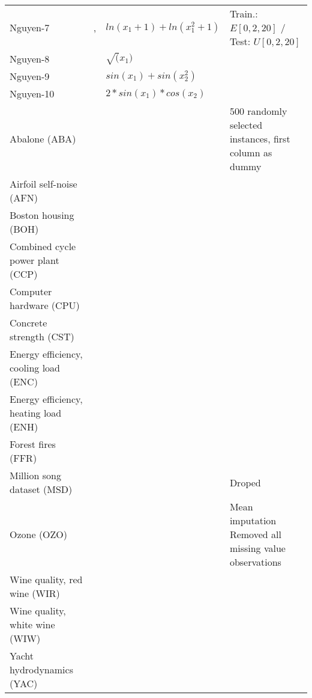 \begin{table*}[htbp]
\begin{center}
\begin{tabular}{llll}
Nguyen-7 & \cite{krawiec2013approximating},\cite{worm2013prioritized,wieloch2013running,harada2014asynchronously,krawiec2014behavioral,demelo2014kaizen,lacava2015genetic,liskowski2017discovery} & $ln(x_1+1)+ln(x_1^2+1)$ & Train.: $E[0,2,20]$ / Test: $U[0,2,20]$ \\ 
Nguyen-8 & \cite{worm2013prioritized,wieloch2013running,demelo2014kaizen,liskowski2017discovery} & $\sqrt(x_1)$ &  \\ 
Nguyen-9 & \cite{worm2013prioritized,wieloch2013running,krawiec2014behavioral,demelo2014kaizen,liskowski2017discovery} & $sin(x_1)+sin(x_2^2)$ &  \\ 
Nguyen-10 & \cite{worm2013prioritized,wieloch2013running,krawiec2014behavioral,demelo2014kaizen} & $2*sin(x_1)*cos(x_2)$ &  \\ 
Abalone (ABA) & \cite{thuong2017combining} &  & 500 randomly selected instances, first column as dummy \\ 
Airfoil self-noise (AFN) & \cite{oliveira2016dispersion} & &  \\ 
Boston housing (BOH) & \cite{whigham2015examining,dick2015reexamination,lacava2016epsilon,thuong2017combining} &  &  \\ 
Combined cycle power plant (CCP) & \cite{medernach2016new} & &  \\ 
Computer hardware (CPU) & \cite{oliveira2016dispersion} &  &  \\ 
Concrete strength (CST) & \cite{medernach2016new,oliveira2016dispersion} &  &  \\ 
Energy efficiency, cooling load (ENC) & \cite{arnaldo2014multiple,arnaldo2015building,lacava2016epsilon,oliveira2016dispersion} & &  \\ 
Energy efficiency, heating load (ENH) & \cite{arnaldo2014multiple,arnaldo2015building,lacava2016epsilon,oliveira2016dispersion} &  & \\ 
Forest fires (FFR) & \cite{oliveira2016dispersion} & &  \\ 
Million song dataset (MSD) & \cite{arnaldo2015building} & & Droped \\ 
Ozone (OZO) & \cite{thuong2017combining} &  & Mean imputation
 Removed all missing value observations \\ 
Wine quality, red wine (WIR) & \cite{arnaldo2014multiple,arnaldo2015building,oliveira2016dispersion} &  &  \\ 
Wine quality, white wine (WIW) & \cite{arnaldo2014multiple,arnaldo2015building,oliveira2016dispersion} &  &  \\ 
Yacht hydrodynamics (YAC) & \cite{medernach2016new} &  &  \\ 
\end{tabular}
\end{center}
\label{tab:datasets}
\end{table*}